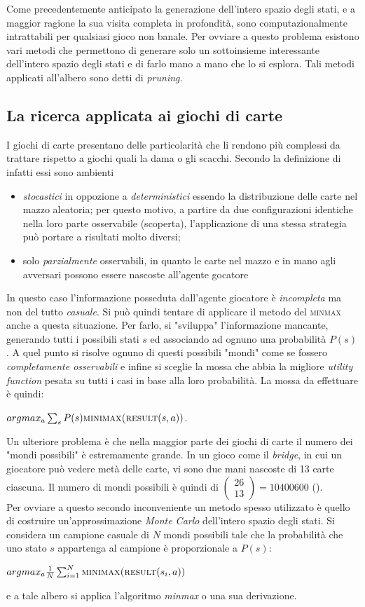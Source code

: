 Come precedentemente anticipato la generazione dell'intero spazio degli stati, e a maggior ragione la sua visita completa in profondità, sono computazionalmente intrattabili per qualsiasi gioco non banale.
Per ovviare a questo problema esistono vari metodi che permettono di generare solo un sottoinsieme interessante dell'intero spazio degli stati e di farlo mano a mano che lo si esplora. Tali metodi applicati all'albero sono detti di \emph{pruning}.

\subsection{La ricerca applicata ai giochi di carte}

I giochi di carte presentano delle particolarità che li rendono più complessi da trattare rispetto a giochi quali la dama o gli scacchi.
Secondo la definizione di \cite{randw} infatti essi sono ambienti
\begin{itemize}
   \item \emph{stocastici} in oppozione a \emph{deterministici} essendo la distribuzione delle carte nel mazzo aleatoria; per questo motivo, a partire da due configurazioni identiche nella loro parte osservabile (scoperta), l'applicazione di una stessa strategia può portare a risultati molto diversi;
   \item solo \emph{parzialmente} osservabili, in quanto le carte nel mazzo e in mano agli avversari possono essere nascoste all'agente gocatore
\end{itemize}
In questo caso l'informazione posseduta dall'agente giocatore è \emph{incompleta} ma non del tutto \emph{casuale}.
Si può quindi tentare di applicare il metodo del \textsc{minmax} anche a questa situazione.
Per farlo, si "sviluppa" l'informazione mancante, generando tutti i possibili stati $s$ ed associando ad ognuno una probabilità $P(s)$.
A quel punto si risolve ognuno di questi possibili "mondi" come se fossero \emph{completamente osservabili} e infine si sceglie la mossa che abbia la migliore \emph{utility function} pesata su tutti i casi in base alla loro probabilità.
La mossa da effettuare è quindi:

\begin{center}
$ argmax_a \sum_{s} P(s) \textsc{minimax(result}(s,a)) $.\\
\end{center}
Un ulteriore problema è che nella maggior parte dei giochi di carte il numero dei "mondi possibili" è estremamente grande.
In un gioco come il \emph{bridge}, in cui un giocatore può vedere metà delle carte, vi sono due mani nascoste di 13 carte ciascuna.
Il numero di mondi possibili è quindi di $ \left(\! \begin{array}{c} 26 \\  13\end{array}\!\right)  = 10 400 600 $ (\cite{randw}).\\
Per ovviare a questo secondo inconveniente un metodo spesso utilizzato è quello di costruire un'approssimazione \emph{Monte Carlo} dell'intero spazio degli stati.
Si considera un campione casuale di $N$ mondi possibili tale che la probabilità che uno stato $s$ appartenga al campione è proporzionale a $P(s)$:

\begin{center}
$argmax_a \frac{1}{N} \sum_{i=1}^{N}  \textsc{minimax(result}(s_i,a)) $ \cite{randw}\\
\end{center}
e a tale albero si applica l'algoritmo \emph{minmax} o una sua derivazione.
